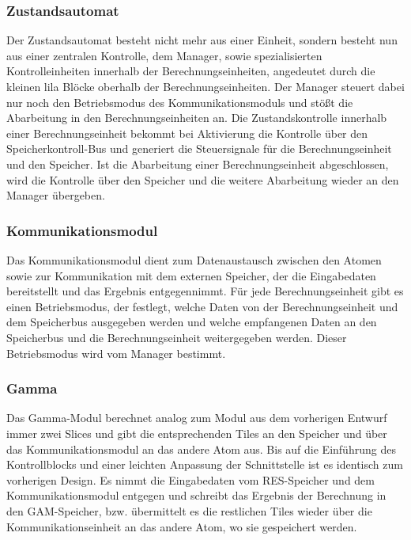 \subsubsection{Zustandsautomat}
Der Zustandsautomat besteht nicht mehr aus einer Einheit, sondern besteht nun aus einer zentralen Kontrolle, dem Manager,
sowie spezialisierten Kontrolleinheiten innerhalb der Berechnungseinheiten, angedeutet durch die kleinen lila Blöcke oberhalb der Berechnungseinheiten.
Der Manager steuert dabei nur noch den Betriebsmodus des Kommunikationsmoduls und stößt die Abarbeitung in den Berechnungseinheiten an.
Die Zustandskontrolle innerhalb einer Berechnungseinheit bekommt bei Aktivierung die Kontrolle über den Speicherkontroll-Bus
und generiert die Steuersignale für die Berechnungseinheit und den Speicher. Ist die Abarbeitung einer Berechnungseinheit abgeschlossen,
wird die Kontrolle über den Speicher und die weitere Abarbeitung wieder an den Manager übergeben.

\subsubsection{Kommunikationsmodul}
Das Kommunikationsmodul dient zum Datenaustausch zwischen den Atomen sowie zur Kommunikation mit dem externen Speicher, der die Eingabedaten bereitstellt und das Ergebnis entgegennimmt.
Für jede Berechnungseinheit gibt es einen Betriebsmodus, der festlegt, welche Daten von der Berechnungseinheit und dem Speicherbus ausgegeben werden und welche empfangenen Daten
an den Speicherbus und die Berechnungseinheit weitergegeben werden. Dieser Betriebsmodus wird vom Manager bestimmt.

\subsubsection{Gamma}
Das Gamma-Modul berechnet analog zum Modul aus dem vorherigen Entwurf immer zwei Slices und gibt die entsprechenden Tiles
an den Speicher und über das Kommunikationsmodul an das andere Atom aus. Bis auf die Einführung des Kontrollblocks
und einer leichten Anpassung der Schnittstelle ist es identisch zum vorherigen Design.
Es nimmt die Eingabedaten vom RES-Speicher und dem Kommunikationsmodul entgegen und schreibt das Ergebnis der Berechnung in den GAM-Speicher,
bzw. übermittelt es die restlichen Tiles wieder über die Kommunikationseinheit an das andere Atom, wo sie gespeichert werden.

